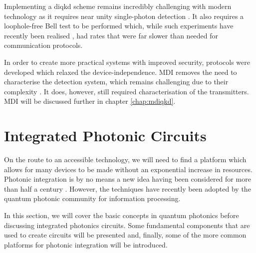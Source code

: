 Implementing a \ac{diqkd} scheme remains incredibly challenging with modern technology as it requires near unity single-photon detection \cite{pironio2009device}. It also requires a loophole-free Bell test to be performed which, while such experiments have recently been realised \cite{Giustina2015, shalm2015, hensen2015}, had rates that were far slower than needed for communication protocols. 

In order to create more practical systems with improved security, protocols were developed which relaxed the device-independence. \Ac{MDI} removes the need to characterise the detection system, which remains challenging due to their complexity \cite{mdi-qkd}. It does, however, still required characterisation of the transmitters. \Ac{MDI} will be discussed further in chapter \ref{chap:mdiqkd}.




\section{Integrated Photonic Circuits}

On the route to an accessible technology, we will need to find a platform which allows for many devices to be made without an exponential increase in resources. Photonic integration is by no means a new idea having been considered for more than half a century \cite{miller1969}. However, the techniques have recently been adopted by the quantum photonic community for information processing.

In this section, we will cover the basic concepts in quantum photonics before discussing integrated photonics circuits. Some fundamental components that are used to create circuits will be presented and, finally, some of the more common platforms for photonic integration will be introduced.


